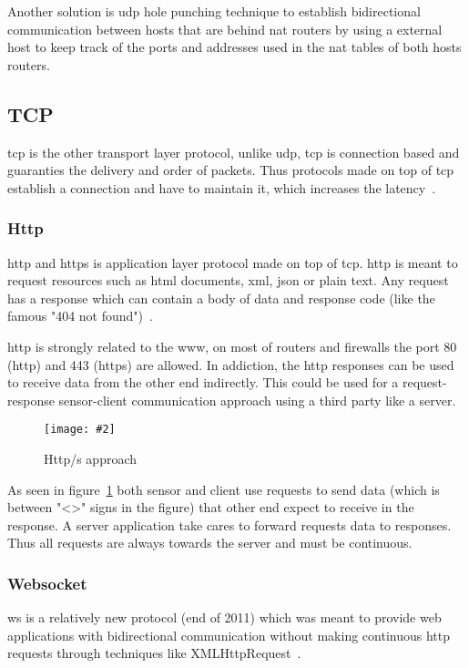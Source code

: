 \documentclass[hidelinks,11pt,a4paper,oneside,article]{memoir}
\newcommand{\putimage}[3][10] %
{
\begin{figure}[h]
	\centering
	\captionsetup{justification=centering}
	\texttt{[image: \#2]}
	\caption{#3}
	\label{fig:#2}
\end{figure}
}
\begin{document}
Another solution is \gls{udp} hole punching technique to establish bidirectional communication between hosts that are behind \gls{nat} routers by using a external host to keep track of the ports and addresses used in the \gls{nat} tables of both hosts routers.




\subsection{TCP}
\gls{tcp} is the other transport layer protocol, unlike \gls{udp}, \gls{tcp} is connection based and guaranties the delivery and order of packets. Thus protocols made on top of \gls{tcp} establish a connection and have to maintain it, which increases the latency~\cite[19]{tcpip}.

\subsubsection{Http}\label{sec:http}
\gls{http} and \gls{https} is application layer protocol made on top of \gls{tcp}. \gls{http} is meant to request resources such as \gls{html} documents, \gls{xml}, \gls{json} or plain text. Any request has a response which can contain a body of data and response code (like the famous "404 not found")~\cite{http-rfc}.

\gls{http} is strongly related to the \gls{www}, on most of routers and firewalls the port 80 (\gls{http}) and 443 (\gls{https}) are allowed. In addiction, the \gls{http} responses can be used to receive data from the other end indirectly. This could be used for a request-response sensor-client communication approach using a third party like a server.

\putimage[14]{http-approach}{Http/s approach}

As seen in figure~\ref{fig:http-approach} both sensor and client use requests to send data (which is between "<>" signs in the figure) that other end expect to receive in the response. A server application take cares to forward requests data to responses. Thus all requests are always towards the server and must be continuous.

\subsubsection{Websocket}
\gls{ws} is a relatively new protocol (end of 2011) which was meant to provide web applications with bidirectional communication without making continuous \gls{http} requests through techniques like XMLHttpRequest~\cite[4]{rfc6455}.
\end{document}
